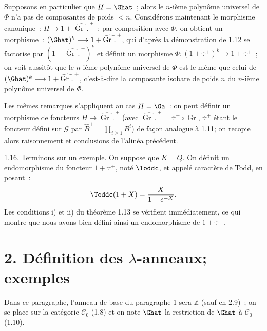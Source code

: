 
Supposons en particulier que \(H=\Ghat\)~; alors le \(n\)-ième polynôme universel de \(\Phi\) n'a pas de composantes de poids \(<n\). Considérons maintenant le morphisme canonique~: \(H\longrightarrow1+\widehat{\operatorname{Gr}\,\mathord{.}\,}^{+}\)~; par composition avec \(\Phi\), on obtient un morphisme~: \((\Ghat)^k\longrightarrow1+\widehat{\operatorname{Gr}\,\mathord{.}\,}^{+}\), qui d'après la démonstration de 1.12 se factorise par \((1+\widehat{\operatorname{Gr}\,\mathord{.}\,}^{+})^k\) et définit un morphisme \(\Phi:(1+\widehat{\,\mathord{.}\,}^{+})^k\longrightarrow1+\widehat{\,\mathord{.}\,}^{+}\)~; on voit aussitôt que le \(n\)-ième polynôme universel de \(\Phi\) est le même que celui de \((\Ghat)^k\longrightarrow1+\widehat{\operatorname{Gr}\,\mathord{.}\,}^{+}\), c'est-à-dire la composante isobare de poids \(n\) du \(n\)-ième polynôme universel de \(\Phi\).

Les mêmes remarques s'appliquent au cas \(H=\Ga\)~: on peut définir un morphisme de foncteurs \(H\longrightarrow\widehat{\operatorname{Gr}\,\mathord{.}\,}^{+}\) (avec \(\widehat{\operatorname{Gr}\,\mathord{.}\,}^{+}=\widehat{\,\mathord{.}\,}^{+}\circ\operatorname{Gr}\), \(\widehat{\,\mathord{.}\,}^{+}\) étant le foncteur défini sur \(\mathcal G\) par \(\widehat B^+=\prod_{i\geq1}B^i\)) de façon analogue à 1.11; on recopie alors raisonnement et conclusions de l'alinéa précédent.

1.16. Terminons sur un exemple. On suppose que \(K=Q\). On définit un endomorphisme du foncteur \(1+\widehat{\,\mathord{.}\,}^{+}\), noté \(\Toddc\), et appelé caractère de Todd, en posant~:
\[
  \Toddc(1+X)=\frac{X}{1-e^{-X}}.
\]
Les conditions i) et ii) du théorème 1.13 se vérifient immédiatement, ce qui montre que nous avons bien défini ainsi un endomorphisme de \(1+\widehat{\,\mathord{.}\,}^{+}\).

\section*{2. Définition des \(\lambda\)-anneaux; exemples}

Dans ce paragraphe, l'anneau de base du paragraphe 1 sera \(\mathbb Z\) (sauf en 2.9)~; on se place sur la catégorie \(\mathcal C_0\) (1.8) et on note \(\Ghat\) la restriction de \(\Ghat\) à \(\mathcal C_0\) (1.10).

